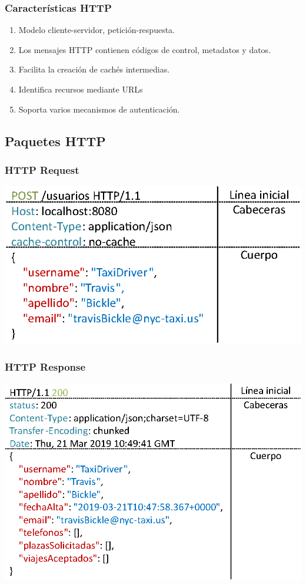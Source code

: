 \documentclass[a4paper,slidestop,xcolor=pst,blue]{beamer}
\begin{document}
\begin{frame}[c]
    \frametitle{Características HTTP}
    \begin{enumerate}[<+->]
        \item Modelo cliente-servidor, petición-respuesta.
        \item Los mensajes HTTP contienen códigos de control, metadatos y datos.
        \item Facilita la creación de cachés intermedias.
        \item Identifica recursos mediante URLs
        \item Soporta varios mecanismos de autenticación.
    \end{enumerate}
\end{frame}

\subsection{Paquetes HTTP}

\begin{frame}[c,fragile]
    \frametitle{HTTP Request}
    \begin{center}
        \includegraphics[width=0.8\linewidth]{images/http/httpRequest.eps}
    \end{center}
\end{frame}

\begin{frame}[c,fragile]
    \frametitle{HTTP Response}
    \begin{center}
        \includegraphics[width=0.8\linewidth]{images/http/httpResponse.eps}
    \end{center}
\end{frame}
\end{document}
